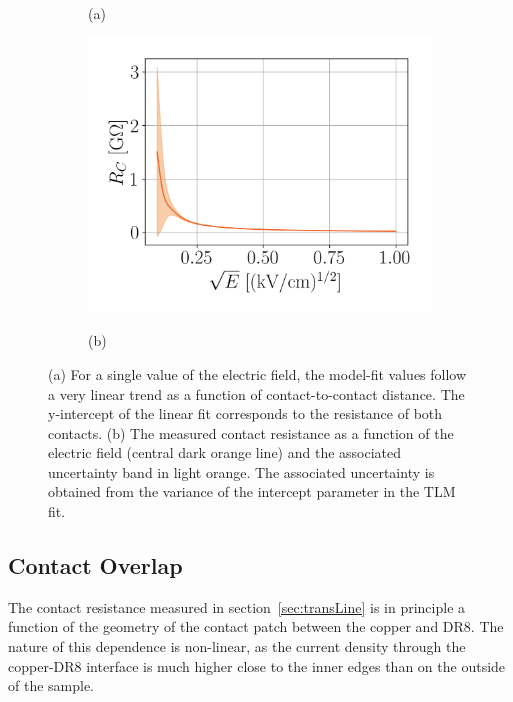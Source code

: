 \documentclass[a4paper,12pt]{article}
\newcommand{\DR}{DR8}
\begin{document}
\begin{figure}[htb]
\begin{subfigure}[c]{0.32\textheight}
\begin{center}
		\vspace*{-\baselineskip} \hspace{1em} (a)
	\end{center}
\end{subfigure}
\begin{subfigure}[c]{0.32\textheight}
	\begin{center}
		\includegraphics[width=\textwidth]{TLM_length_contactRes.png}
		
		\vspace*{-\baselineskip} \hspace{2em} (b)
	\end{center}
\end{subfigure}
\caption{(a) For a single value of the electric field, the model-fit values follow a very linear trend as a function of contact-to-contact distance.  The y-intercept of the linear fit corresponds to the resistance of both contacts. (b) The measured contact resistance as a function of the electric field (central dark orange line) and the associated uncertainty band in light orange. The associated uncertainty is obtained from the variance of the intercept parameter in the TLM fit.} 
\label{fig:TLM_length_contactRes}
\end{figure}

\subsection{Contact Overlap}
\label{sec:contactOverlap}

The contact resistance measured in section~\ref{sec:transLine} is in principle a function of the geometry of the contact patch between the copper and {\DR}.  The nature of this dependence is non-linear, as the current density through the copper-{\DR} interface is much higher close to the inner edges than on the outside of the sample.
\end{document}
